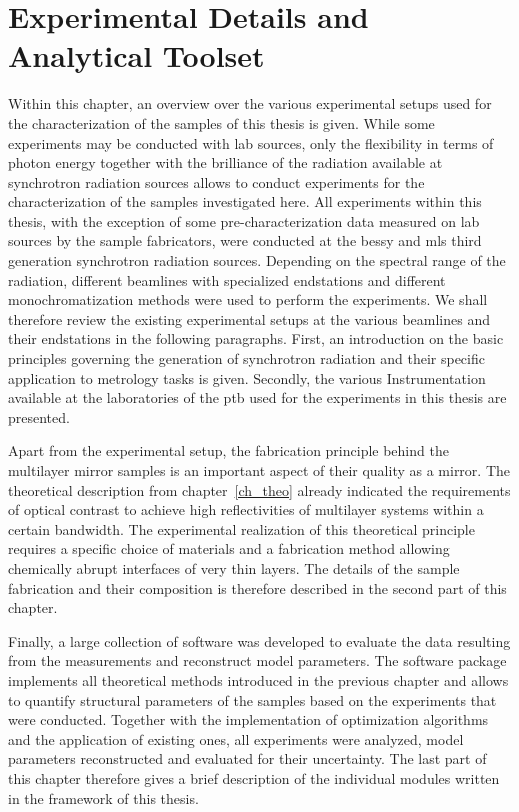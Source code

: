 \chapter{Experimental Details and Analytical Toolset} \label{ch_exp}
Within this chapter, an overview over the various experimental setups used for the characterization of the samples of this thesis is given. While some experiments may be conducted with lab sources, only the flexibility in terms of photon energy together with the brilliance of the radiation available at synchrotron radiation sources allows to conduct experiments for the characterization of the samples investigated here. All experiments within this thesis, with the exception of some pre-characterization data measured on lab sources by the sample fabricators, were conducted at the \gls{bessy} and \gls{mls} third generation synchrotron radiation sources. Depending on the spectral range of the radiation, different beamlines with specialized endstations and different monochromatization methods were used to perform the experiments. We shall therefore review the existing experimental setups at the various beamlines and their endstations in the following paragraphs. First, an introduction on the basic principles governing the generation of synchrotron radiation and their specific application to metrology tasks is given. Secondly, the various Instrumentation available at the laboratories of the \gls{ptb} used for the experiments in this thesis are presented.

Apart from the experimental setup, the fabrication principle behind the multilayer mirror samples is an important aspect of their quality as a mirror. The theoretical description from chapter~\ref{ch_theo} already indicated the requirements of optical contrast to achieve high reflectivities of multilayer systems within a certain bandwidth. The experimental realization of this theoretical principle requires a specific choice of materials and a fabrication method allowing chemically abrupt interfaces of very thin layers. The details of the sample fabrication and their composition is therefore described in the second part of this chapter.

Finally, a large collection of software was developed to evaluate the data resulting from the measurements and reconstruct model parameters. The software package implements all theoretical methods introduced in the previous chapter and allows to quantify structural parameters of the samples based on the experiments that were conducted. Together with the implementation of optimization algorithms and the application of existing ones, all experiments were analyzed, model parameters reconstructed and evaluated for their uncertainty. The last part of this chapter therefore gives a brief description of the individual modules written in the framework of this thesis.

